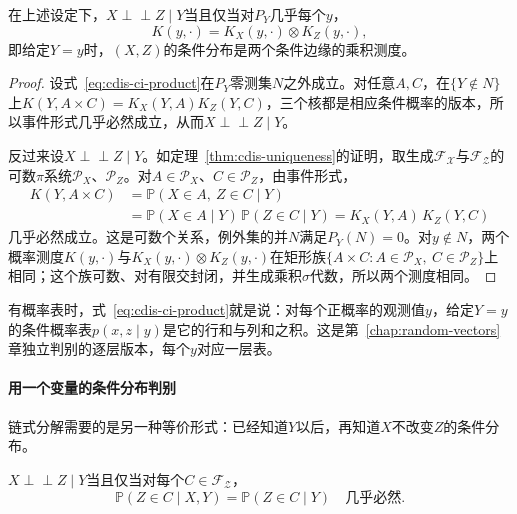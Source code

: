 \begin{theorem}[条件独立的乘积判别]
\label{thm:cdis-ci-product}
在上述设定下，$X\perp\!\!\!\perp Z\mid Y$当且仅当对$P_Y$几乎每个$y$，
\begin{equation}
 K(y,\cdot)=K_X(y,\cdot)\otimes K_Z(y,\cdot),
 \label{eq:cdis-ci-product}
\end{equation}
即给定$Y=y$时，$(X,Z)$的条件分布是两个条件边缘的乘积测度。
\end{theorem}

\begin{proof}
设式~\eqref{eq:cdis-ci-product}在$P_Y$零测集$N$之外成立。对任意$A,C$，在$\{Y\notin N\}$上$K(Y,A\times C)=K_X(Y,A)K_Z(Y,C)$，三个核都是相应条件概率的版本，所以事件形式几乎必然成立，从而$X\perp\!\!\!\perp Z\mid Y$。

反过来设$X\perp\!\!\!\perp Z\mid Y$。如定理~\ref{thm:cdis-uniqueness}的证明，取生成$\mathcal{F}_{\mathcal{X}}$与$\mathcal{F}_{\mathcal{Z}}$的可数$\pi$系统$\mathcal{P}_X$、$\mathcal{P}_Z$。对$A\in\mathcal{P}_X$、$C\in\mathcal{P}_Z$，由事件形式，
\[
 \begin{aligned}
 K(Y,A\times C)&=\mathbb{P}(X\in A,\ Z\in C\mid Y)\\
 &=\mathbb{P}(X\in A\mid Y)\,\mathbb{P}(Z\in C\mid Y)=K_X(Y,A)\,K_Z(Y,C)
 \end{aligned}
\]
几乎必然成立。这是可数个关系，例外集的并$N$满足$P_Y(N)=0$。对$y\notin N$，两个概率测度$K(y,\cdot)$与$K_X(y,\cdot)\otimes K_Z(y,\cdot)$在矩形族$\{A\times C:A\in\mathcal{P}_X,\ C\in\mathcal{P}_Z\}$上相同；这个族可数、对有限交封闭，并生成乘积$\sigma$代数，所以两个测度相同。
\end{proof}

有概率表时，式~\eqref{eq:cdis-ci-product}就是说：对每个正概率的观测值$y$，给定$Y=y$的条件概率表$p(x,z\mid y)$是它的行和与列和之积。这是第~\ref{chap:random-vectors}章独立判别的逐层版本，每个$y$对应一层表。

\paragraph{用一个变量的条件分布判别}
链式分解需要的是另一种等价形式：已经知道$Y$以后，再知道$X$不改变$Z$的条件分布。

\begin{theorem}[条件独立与条件变量的省略]
\label{thm:cdis-ci-markov}
$X\perp\!\!\!\perp Z\mid Y$当且仅当对每个$C\in\mathcal{F}_{\mathcal{Z}}$，
\begin{equation}
 \mathbb{P}(Z\in C\mid X,Y)=\mathbb{P}(Z\in C\mid Y)\quad\text{几乎必然}.
 \label{eq:cdis-ci-markov}
\end{equation}
\end{theorem}

